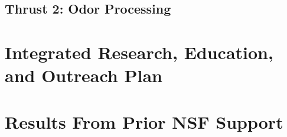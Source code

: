 \documentclass[11 pt]{article}
\begin{document}
%

\subsection{Thrust 2: Odor Processing}
\label{sec:tract2}
\label{ssec:research2}


%

\section{Integrated Research, Education, and Outreach Plan}
\label{sec:irep}


\section{Results From Prior NSF Support}
\label{sec:prior_nsf}

\end{document}
